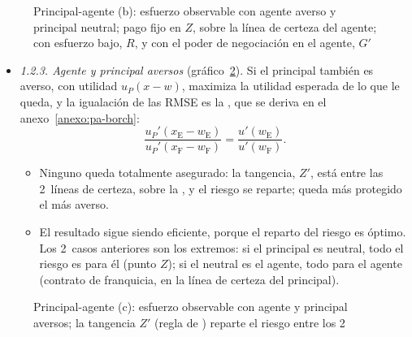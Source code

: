 \documentclass[11pt]{article}
\begin{document}
\begin{figure}[H]
\centering
\caption{Principal-agente (b): esfuerzo observable con agente averso y principal neutral; pago fijo en $Z$, sobre la línea de certeza del agente; con esfuerzo bajo, $R$, y con el poder de negociación en el agente, $G'$}\label{fig:principal-agente-a}
\end{figure}

\begin{itemize}
\item \emph{1.2.3. Agente y principal aversos} (gráfico~\ref{fig:pa-aversos}). Si el principal también es averso, con utilidad $u_P(x-w)$, maximiza la utilidad esperada de lo que le queda, y la igualación de las RMSE es la \nocite{Borch1962Equilibrium}, que se deriva en el anexo~\ref{anexo:pa-borch}:
  \begin{equation*}
  \frac{u_P'(x_{\mathrm{E}}-w_{\mathrm{E}})}{u_P'(x_{\mathrm{F}}-w_{\mathrm{F}})}=\frac{u'(w_{\mathrm{E}})}{u'(w_{\mathrm{F}})} .
  \end{equation*}
  \begin{itemize}
  \item Ninguno queda totalmente asegurado: la tangencia, $Z'$, está entre las 2~líneas de certeza, sobre la , y el riesgo se reparte; queda más protegido el más averso.
  \item El resultado sigue siendo eficiente, porque el reparto del riesgo es óptimo. Los 2~casos anteriores son los extremos: si el principal es neutral, todo el riesgo es para él (punto $Z$); si el neutral es el agente, todo para el agente (contrato de franquicia, en la línea de certeza del principal).
  \end{itemize}
\end{itemize}

\begin{figure}[H]
\centering
\caption{Principal-agente (c): esfuerzo observable con agente y principal aversos; la tangencia $Z'$ (regla de ) reparte el riesgo entre los 2}\label{fig:pa-aversos}
\end{figure}
\end{document}
